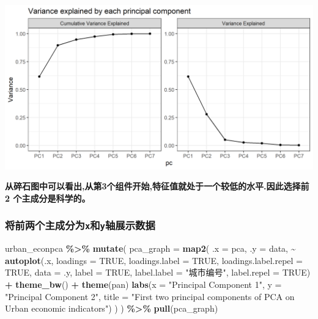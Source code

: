 \documentclass[
]{article}
\newenvironment{Shaded}{\begin{snugshade}}{\end{snugshade}}
\newcommand{\AttributeTok}[1]{\textcolor[rgb]{0.13,0.29,0.53}{#1}}
\newcommand{\ConstantTok}[1]{\textcolor[rgb]{0.56,0.35,0.01}{#1}}
\newcommand{\FunctionTok}[1]{\textcolor[rgb]{0.13,0.29,0.53}{\textbf{#1}}}
\newcommand{\NormalTok}[1]{#1}
\newcommand{\SpecialCharTok}[1]{\textcolor[rgb]{0.81,0.36,0.00}{\textbf{#1}}}
\newcommand{\StringTok}[1]{\textcolor[rgb]{0.31,0.60,0.02}{#1}}
\begin{document}
\begin{center}\includegraphics[width=1\linewidth,height=1\textheight]{../picture/rmd/exp6/pac_plot1-1.png} \end{center}

\textbf{从碎石图中可以看出,从第3个组件开始,特征值就处于一个较低的水平.因此选择前2
个主成分是科学的。}

\subsubsection{\texorpdfstring{将前两个主成分为\texttt{x}和\texttt{y}轴展示数据}{将前两个主成分为x和y轴展示数据}}\label{ux5c06ux524dux4e24ux4e2aux4e3bux6210ux5206ux4e3axux548cyux8f74ux5c55ux793aux6570ux636e}

\begin{Shaded}
\begin{Highlighting}[]
\NormalTok{urban\_econpca }\SpecialCharTok{\%\textgreater{}\%}
  \FunctionTok{mutate}\NormalTok{(}
    \AttributeTok{pca\_graph =} \FunctionTok{map2}\NormalTok{(}
      \AttributeTok{.x =}\NormalTok{ pca,}
      \AttributeTok{.y =}\NormalTok{ data,}
      \SpecialCharTok{\textasciitilde{}} \FunctionTok{autoplot}\NormalTok{(.x, }\AttributeTok{loadings =} \ConstantTok{TRUE}\NormalTok{, }\AttributeTok{loadings.label =} \ConstantTok{TRUE}\NormalTok{,}
                 \AttributeTok{loadings.label.repel =} \ConstantTok{TRUE}\NormalTok{,}
                 \AttributeTok{data =}\NormalTok{ .y, }\AttributeTok{label =} \ConstantTok{TRUE}\NormalTok{,}
                 \AttributeTok{label.label =} \StringTok{"城市编号"}\NormalTok{,}
                 \AttributeTok{label.repel =} \ConstantTok{TRUE}\NormalTok{) }\SpecialCharTok{+}
        \FunctionTok{theme\_bw}\NormalTok{() }\SpecialCharTok{+}
        \FunctionTok{theme}\NormalTok{(pan)}
        \FunctionTok{labs}\NormalTok{(}\AttributeTok{x =} \StringTok{"Principal Component 1"}\NormalTok{,}
             \AttributeTok{y =} \StringTok{"Principal Component 2"}\NormalTok{,}
             \AttributeTok{title =} \StringTok{"First two principal components of PCA on Urban economic indicators"}\NormalTok{)}
\NormalTok{      )}
\NormalTok{  ) }\SpecialCharTok{\%\textgreater{}\%}
  \FunctionTok{pull}\NormalTok{(pca\_graph)}
\end{Highlighting}
\end{Shaded}
\end{document}
